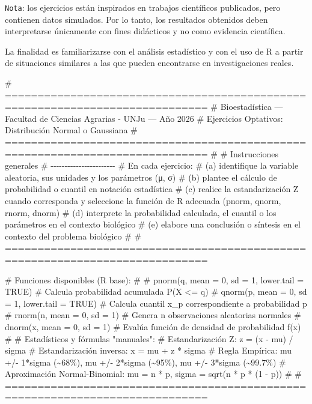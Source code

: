 \documentclass[
  spanish,
  letterpaper,
  DIV=11,
  numbers=noendperiod]{scrreprt}
\newenvironment{Shaded}{\begin{snugshade}}{\end{snugshade}}
\newcommand{\CommentTok}[1]{\textcolor[rgb]{0.37,0.37,0.37}{#1}}
\begin{document}
\texttt{Nota}: los ejercicios están inspirados en trabajos científicos
publicados, pero contienen datos simulados. Por lo tanto, los resultados
obtenidos deben interpretarse únicamente con fines didácticos y no como
evidencia científica.

La finalidad es familiarizarse con el análisis estadístico y con el uso
de R a partir de situaciones similares a las que pueden encontrarse en
investigaciones reales.

\begin{Shaded}
\begin{Highlighting}[]

\CommentTok{\# =============================================================================}
\CommentTok{\#  Bioestadística — Facultad de Ciencias Agrarias {-} UNJu — Año 2026}
\CommentTok{\#  Ejercicios Optativos: Distribución Normal o Gaussiana}
\CommentTok{\# =============================================================================}
\CommentTok{\#}
\CommentTok{\#  Instrucciones generales}
\CommentTok{\#  {-}{-}{-}{-}{-}{-}{-}{-}{-}{-}{-}{-}{-}{-}{-}{-}{-}{-}{-}{-}{-}{-}{-}}
\CommentTok{\#  En cada ejercicio:}
\CommentTok{\#    (a) identifique la variable aleatoria, sus unidades y los parámetros (μ, σ)}
\CommentTok{\#    (b) plantee el cálculo de probabilidad o cuantil en notación estadística}
\CommentTok{\#    (c) realice la estandarización Z cuando corresponda y seleccione la función de R adecuada (pnorm, qnorm, rnorm, dnorm)}
\CommentTok{\#    (d) interprete la probabilidad calculada, el cuantil o los parámetros en el contexto biológico}
\CommentTok{\#    (e) elabore una conclusión o síntesis en el contexto del problema biológico}
\CommentTok{\#}
\CommentTok{\# =============================================================================}

\CommentTok{\#  Funciones disponibles (R base):}
\CommentTok{\#}
\CommentTok{\#    pnorm(q, mean = 0, sd = 1, lower.tail = TRUE)  \# Calcula probabilidad acumulada P(X \textless{}= q)}
\CommentTok{\#    qnorm(p, mean = 0, sd = 1, lower.tail = TRUE)  \# Calcula cuantil x\_p correspondiente a probabilidad p}
\CommentTok{\#    rnorm(n, mean = 0, sd = 1)                     \# Genera n observaciones aleatorias normales}
\CommentTok{\#    dnorm(x, mean = 0, sd = 1)                     \# Evalúa función de densidad de probabilidad f(x)}
\CommentTok{\#}
\CommentTok{\#  Estadísticos y fórmulas "manuales":}
\CommentTok{\#    Estandarización Z:            z = (x {-} mu) / sigma}
\CommentTok{\#    Estandarización inversa:         x = mu + z * sigma}
\CommentTok{\#    Regla Empírica:               mu +/{-} 1*sigma (\textasciitilde{}68\%), mu +/{-} 2*sigma (\textasciitilde{}95\%), mu +/{-} 3*sigma (\textasciitilde{}99.7\%)}
\CommentTok{\#    Aproximación Normal{-}Binomial: mu = n * p, sigma = sqrt(n * p * (1 {-} p))}
\CommentTok{\#}
\CommentTok{\# =============================================================================}



\end{Highlighting}
\end{Shaded}
\end{document}
